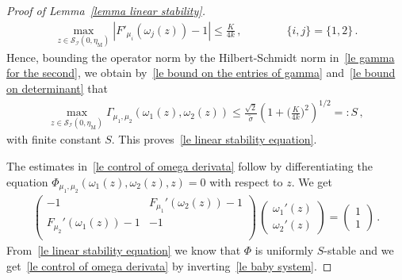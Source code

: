 \documentclass[10pt,reqno]{amsart}
\numberwithin{equation}{section}
\theoremstyle{plain}
\numberwithin{kevin}{section}
\theoremstyle{remark}
\newcommand{\PP}{\Phi}
\begin{document}
\begin{proof}[Proof of Lemma~\ref{lemma linear stability}]
\begin{align}\label{le bound on the entries of gamma}
\max_{z\in\mathcal{S}_{\mathcal{I}}(0,\eta_{\mathrm{M}})}|F'_{\mu_i}(\omega_j(z))-1|\le \frac{K}{4k}\,,\qquad\qquad \{i,j\}=\{1,2\}\,.
\end{align}
Hence, bounding the operator norm by the Hilbert-Schmidt norm in~\eqref{le gamma for the second}, we obtain by~\eqref{le bound on the entries of gamma} and~\eqref{le bound on determinant} that
\begin{align}
 \max_{z\in\mathcal{S}_{\mathcal{I}}(0,\eta_{\mathrm{M}})}\Gamma_{\mu_1,\mu_2}(\omega_1(z),\omega_2(z))\le \frac{\sqrt{2}}{\widetilde\sigma}\left(1+\Big(\frac{K}{4k} \Big)^2\right)^{1/2}=:S\,,
\end{align}
with finite constant $S$. This proves~\eqref{le linear stability equation}.	

The estimates in~\eqref{le control of omega derivata} follow by differentiating the equation $\PP_{\mu_1,\mu_2}(\omega_1(z),\omega_2(z),z)=0$ with respect to $z$. We get
\begin{align}\label{le baby system}\left( \begin{array}{cc}
 -1& F_{\mu_1}'(\omega_2(z))-1  \\
 F_{\mu_2}'(\omega_1(z))-1 & -1\\
   \end{array} \right)\,\left(\begin{array}{c}\omega_1'(z)\\ \omega_2'(z) \end{array}\right)=\left(\begin{array}{c}1\\ 1 \end{array}\right)\,.
\end{align}
From~\eqref{le linear stability equation} we know that $\PP$ is uniformly $S$-stable and we get~\eqref{le control of omega derivata} by inverting~\eqref{le baby system}.\qedhere
\end{proof}
\end{document}

